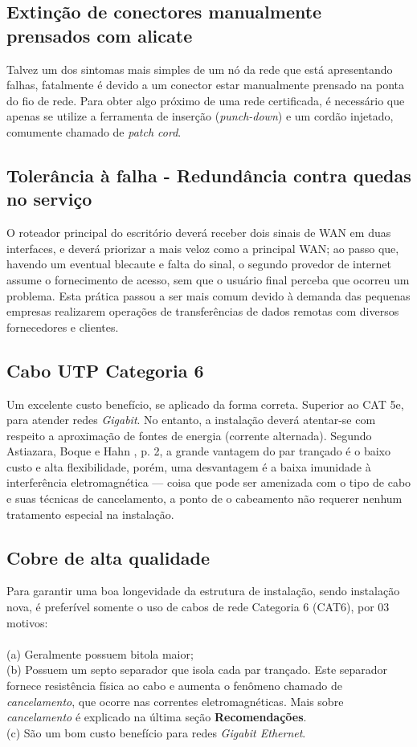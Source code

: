 \documentclass[	DIV=calc,%
							paper=a4,%
							fontsize=12pt,%
							onecolumn]{scrartcl}	 					%
\begin{document}
\subsection{Extinção de conectores manualmente prensados com alicate}
Talvez um dos sintomas mais simples de um nó da rede que está apresentando falhas, fatalmente é devido a um conector estar manualmente prensado na ponta do fio de rede. Para obter algo próximo de uma rede certificada, é necessário que apenas se utilize a ferramenta de inserção (\textit{punch-down}) e um cordão injetado, comumente chamado de \textit{patch cord}.

\subsection{Tolerância à falha - Redundância contra quedas no serviço}
O roteador principal do escritório deverá receber dois sinais de WAN em duas interfaces, e deverá priorizar a mais veloz como a principal WAN; ao passo que, havendo um eventual blecaute e falta do sinal, o segundo provedor de internet assume o fornecimento de acesso, sem que o usuário final perceba que ocorreu um problema. Esta prática passou a ser mais comum devido à demanda das pequenas empresas realizarem operações de transferências de dados remotas com diversos fornecedores e clientes.

\subsection{Cabo UTP Categoria 6}
Um excelente custo benefício, se aplicado da forma correta. Superior ao CAT 5e, para atender redes \textit{Gigabit}. No entanto, a instalação deverá atentar-se com respeito a aproximação de fontes de energia (corrente alternada). Segundo Astiazara, Boque e Hahn \cite{utp}, p. 2, a grande vantagem do par trançado é o  baixo custo e alta flexibilidade, porém, uma desvantagem é a baixa imunidade à interferência eletromagnética --- coisa que pode ser amenizada com o tipo de cabo e suas técnicas de cancelamento, a ponto de o cabeamento não requerer nenhum tratamento especial na instalação. 

\subsection{Cobre de alta qualidade}
Para garantir uma boa longevidade da estrutura de instalação, sendo instalação nova, é preferível somente o uso de cabos de rede Categoria 6 (CAT6), por 03 motivos: \\ \\
(a) Geralmente possuem bitola maior;\\
(b) Possuem um septo separador que isola cada par trançado. Este separador fornece resistência física ao cabo e aumenta o fenômeno chamado de \textit{cancelamento}, que ocorre nas correntes eletromagnéticas. Mais sobre \textit{cancelamento} é explicado na última seção \textbf{Recomendações}.\\
(c) São um bom custo benefício para redes \textit{Gigabit Ethernet}.\\
\end{document}
